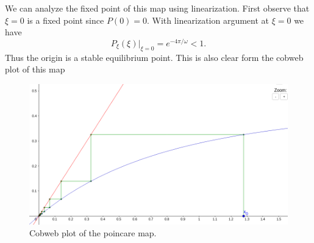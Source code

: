 \begin{ans}
	We can analyze the fixed point of this map using linearization. First observe that $\xi=0$ is a fixed point since $P(0) = 0$. With linearization argument at $\xi=0$ we have
	\[ P_\xi(\xi) |_{\xi=0} = e^{-4\pi/\omega} < 1. \] 
	Thus the origin is a stable equilibrium point. This is also clear form the cobweb plot of this map
	\begin{figure}[h!]
		\centering
		\includegraphics[width=0.7\linewidth]{Images/PoincareMapCobwebFig1}
		\caption{Cobweb plot of the poincare map.}
		\label{fig:poincaremapcobwebfig1}
	\end{figure}
	
\end{ans} 





